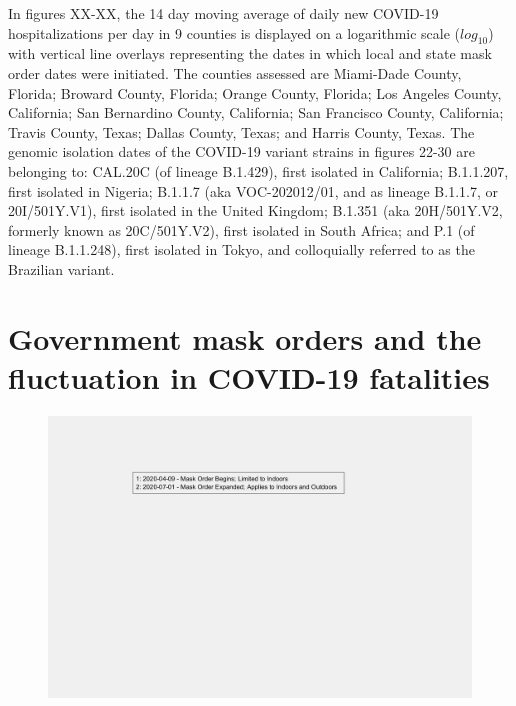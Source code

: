 \documentclass[]{article}
\begin{document}
In figures XX-XX, the 14 day moving average of daily new COVID-19 hospitalizations per day in 9 counties is displayed on a logarithmic scale ($log_{10}$) with vertical line overlays representing the dates in which local and state mask order dates were initiated. The counties assessed are Miami-Dade County, Florida; Broward County, Florida; Orange County, Florida; Los Angeles County, California; San Bernardino County, California; San Francisco County, California; Travis County, Texas; Dallas County, Texas; and Harris County, Texas. The genomic isolation dates of the COVID-19 variant strains in figures 22-30 are belonging to: CAL.20C (of lineage B.1.429), first isolated in California; B.1.1.207, first isolated in Nigeria; B.1.1.7 (aka VOC-202012/01, and as lineage B.1.1.7, or 20I/501Y.V1), first isolated in the United Kingdom; B.1.351 (aka 20H/501Y.V2, formerly known as 20C/501Y.V2), first isolated in South Africa; and P.1 (of lineage B.1.1.248), first isolated in Tokyo, and colloquially referred to as the Brazilian variant.

\FloatBarrier

\vspace{5mm}
\section*{Government mask orders and the fluctuation in COVID-19 fatalities }

\begin{figure}[!h]
	\includegraphics[width=\linewidth]{legends/dade_mask_order_legend.png}
	\caption{}
	\label{fig:legends/dade_mask_order_legendLabel}
\end{figure}
\end{document}
